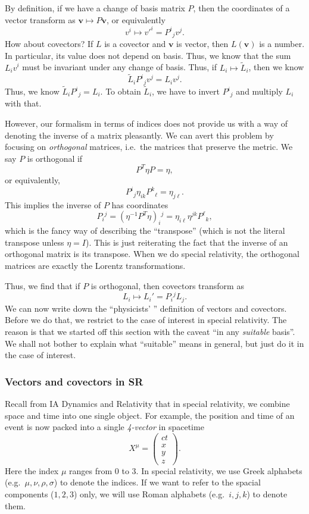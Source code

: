 \documentclass[a4paper]{article}
\begin{document}
By definition, if we have a change of basis matrix $P$, then the coordinates of a vector transform as $\mathbf{v} \mapsto P \mathbf{v}$, or equivalently
\[
  v^i \mapsto v'^i = P^i\!_j v^j.
\]
How about covectors? If $L$ is a covector and $\mathbf{v}$ is vector, then $L(\mathbf{v})$ is a number. In particular, its value does not depend on basis. Thus, we know that the sum $L_i v^i$ must be invariant under any change of basis. Thus, if $L_i \mapsto \tilde{L}_i$, then we know
\[
  \tilde{L}_i P^i\!_j v^j = L_i v^j.
\]
Thus, we know $\tilde{L}_i P^i\!_j = L_i$. To obtain $\tilde{L}_i$, we have to invert $P^i\!_j$ and multiply $L_i$ with that.

However, our formalism in terms of indices does not provide us with a way of denoting the inverse of a matrix pleasantly. We can avert this problem by focusing on \emph{orthogonal} matrices, i.e.\ the matrices that preserve the metric. We say $P$ is orthogonal if
\[
  P^T \eta P = \eta,
\]
or equivalently,
\[
  P^i\!_j \eta_{ik} P^k\!_\ell = \eta_{j\ell}.
\]
This implies the inverse of $P$ has coordinates
\[
  P_i{}^j = (\eta^{-1} P^T \eta)_i\!^j = \eta_{i\ell} \eta^{jk} P^\ell\!_k,
\]
which is the fancy way of describing the ``transpose'' (which is not the literal transpose unless $\eta = I$). This is just reiterating the fact that the inverse of an orthogonal matrix is its transpose. When we do special relativity, the orthogonal matrices are exactly the Lorentz transformations.

Thus, we find that if $P$ is orthogonal, then covectors transform as
\[
  L_i \mapsto L_i' = P_i{}^j L_j.
\]
We can now write down the ``physicists' '' definition of vectors and covectors. Before we do that, we restrict to the case of interest in special relativity. The reason is that we started off this section with the caveat ``in any \emph{suitable} basis''. We shall not bother to explain what ``suitable'' means in general, but just do it in the case of interest.

\subsubsection{Vectors and covectors in SR}
Recall from IA Dynamics and Relativity that in special relativity, we combine space and time into one single object. For example, the position and time of an event is now packed into a single \emph{4-vector} in spacetime
\[
  X^\mu =
  \begin{pmatrix}
    ct\\
    x\\
    y\\
    z
  \end{pmatrix}.
\]
Here the index $\mu$ ranges from $0$ to $3$. In special relativity, we use Greek alphabets (e.g.\ $\mu, \nu, \rho, \sigma$) to denote the indices. If we want to refer to the spacial components ($1, 2, 3$) only, we will use Roman alphabets (e.g.\ $i, j, k$) to denote them.
\end{document}
